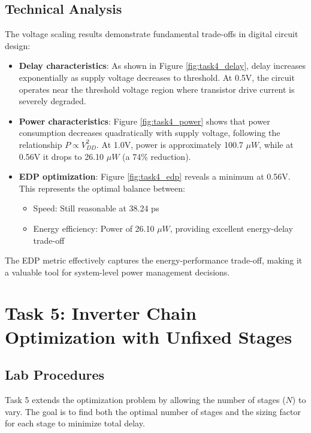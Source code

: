 \documentclass[UTF8,12pt,a4paper]{ctexart}
\begin{document}
\subsection{Technical Analysis}

The voltage scaling results demonstrate fundamental trade-offs in digital circuit design:

\begin{itemize}
    \item[1.] \textbf{Delay characteristics}: As shown in Figure \ref{fig:task4_delay}, delay increases exponentially as supply voltage decreases to threshold. At 0.5V, the circuit operates near the threshold voltage region where transistor drive current is severely degraded.
    
    \item[2.] \textbf{Power characteristics}: Figure \ref{fig:task4_power} shows that power consumption decreases quadratically with supply voltage, following the relationship $P \propto V_{DD}^2$. At 1.0V, power is approximately 100.7 $\mu W$, while at 0.56V it drops to 26.10 $\mu W$ (a 74\% reduction).
    
    \item[3.] \textbf{EDP optimization}: Figure \ref{fig:task4_edp} reveals a minimum at 0.56V. This represents the optimal balance between:
    \begin{itemize}
        \item Speed: Still reasonable at 38.24 ps
        \item Energy efficiency: Power of 26.10 $\mu W$, providing excellent energy-delay trade-off
    \end{itemize}
    
\end{itemize}

The EDP metric effectively captures the energy-performance trade-off, making it a valuable tool for system-level power management decisions.

\newpage
\section{Task 5: Inverter Chain Optimization with Unfixed Stages}

\subsection{Lab Procedures}

Task 5 extends the optimization problem by allowing the number of stages ($N$) to vary. The goal is to find both the optimal number of stages and the sizing factor for each stage to minimize total delay.
\end{document}

